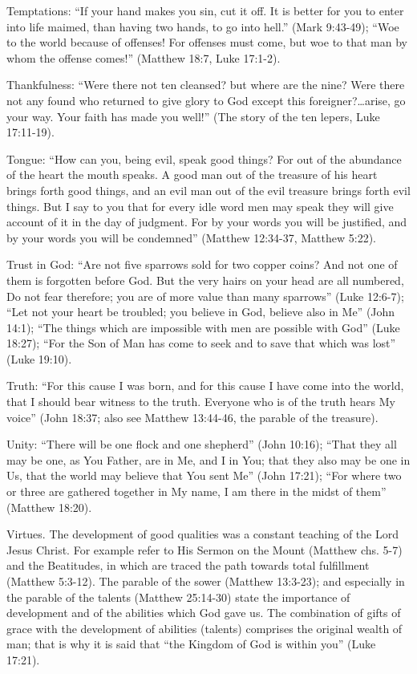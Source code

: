Temptations: ``If your hand makes you sin, cut it off. It is better for you to enter into life maimed, than having two hands, to go into hell.'' (Mark 9:43-49); ``Woe to the world because of offenses! For offenses must come, but woe to that man by whom the offense comes!'' (Matthew 18:7, Luke 17:1-2).

Thankfulness: ``Were there not ten cleansed? but where are the nine? Were there not any found who returned to give glory to God except this foreigner?\ldots arise, go your way. Your faith has made you well!'' (The story of the ten lepers, Luke 17:11-19).

Tongue: ``How can you, being evil, speak good things? For out of the abundance of the heart the mouth speaks. A good man out of the treasure of his heart brings forth good things, and an evil man out of the evil treasure brings forth evil things. But I say to you that for every idle word men may speak they will give account of it in the day of judgment. For by your words you will be justified, and by your words you will be condemned'' (Matthew 12:34-37, Matthew 5:22).

Trust in God: ``Are not five sparrows sold for two copper coins? And not one of them is forgotten before God. But the very hairs on your head are all numbered, Do not fear therefore; you are of more value than many sparrows'' (Luke 12:6-7); ``Let not your heart be troubled; you believe in God, believe also in Me'' (John 14:1); ``The things which are impossible with men are possible with God'' (Luke 18:27); ``For the Son of Man has come to seek and to save that which was lost'' (Luke 19:10).

Truth: ``For this cause I was born, and for this cause I have come into the world, that I should bear witness to the truth. Everyone who is of the truth hears My voice'' (John 18:37; also see Matthew 13:44-46, the parable of the treasure).

Unity: ``There will be one flock and one shepherd'' (John 10:16); ``That they all may be one, as You Father, are in Me, and I in You; that they also may be one in Us, that the world may believe that You sent Me'' (John 17:21); ``For where two or three are gathered together in My name, I am there in the midst of them'' (Matthew 18:20).

Virtues. The development of good qualities was a constant teaching of the Lord Jesus Christ. For example refer to His Sermon on the Mount (Matthew chs. 5-7) and the Beatitudes, in which are traced the path towards total fulfillment (Matthew 5:3-12). The parable of the sower (Matthew 13:3-23); and especially in the parable of the talents (Matthew 25:14-30) state the importance of development and of the abilities which God gave us. The combination of gifts of grace with the development of abilities (talents) comprises the original wealth of man; that is why it is said that ``the Kingdom of God is within you'' (Luke 17:21).

